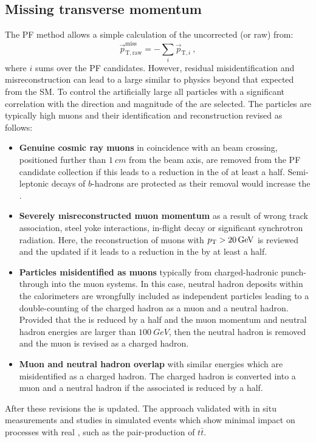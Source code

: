 \subsection{Missing transverse momentum}

The PF method allows a simple calculation of the uncorrected (or raw) \ptmiss
from:
%
\begin{equation}
    \vec{p}_{\mathrm{T,raw}}^{\mathrm{miss}} = - \sum_{i} \vec{p}_{\mathrm{T},i}\ ,
\end{equation}
%
where $i$ sums over the PF candidates. However, residual misidentification and
misreconstruction can lead to a large \ptmiss similar to physics beyond that expected from the SM. To control the artificially large \ptmiss all particles with a
significant correlation with the direction and magnitude of the \ptmiss are
selected. The particles are typically high \pt muons and their identification
and reconstruction revised as follows:
%
\begin{itemize}
    \item \textbf{Genuine cosmic ray muons} in coincidence with an \LHC beam
    crossing, positioned further than ${\SI{1}{cm}}$ from the beam axis, are
    removed from the PF candidate collection if this leads to a reduction in
    the \ptmiss of at least a half. Semi-leptonic decays of $b$-hadrons are
    protected as their removal would increase the \ptmiss.
    \item \textbf{Severely misreconstructed muon momentum} as a result of
    wrong track association, steel yoke interactions, in-flight decay or
    significant synchrotron radiation. Here, the reconstruction of muons with
    ${p_{\text{T}}>\SI{20}{GeV}}$ is reviewed and the \pt updated if it leads to a
    reduction in the \ptmiss by at least a half.
    \item \textbf{Particles misidentified as muons} typically from
    charged-hadronic punch-through into the muon systems. In this case, neutral
    hadron deposits within the calorimeters are wrongfully included as
    independent particles leading to a double-counting of the charged hadron
    as a muon and a neutral hadron. Provided that the \ptmiss is reduced by a
    half and the muon momentum and neutral hadron energies are larger than
    ${\SI{100}{GeV}}$, then the neutral hadron is removed and the muon is
    revised as a charged hadron.
    \item \textbf{Muon and neutral hadron overlap} with similar energies which
    are misidentified as a charged hadron. The charged hadron is converted
    into a muon and a neutral hadron if the associated \ptmiss is reduced by a
    half.
\end{itemize}
%
After these revisions the \ptmiss is updated. The approach validated with
in situ measurements and studies in simulated events which show minimal impact
on processes with real \ptmiss, such as the pair-production of $t\bar{t}$.



